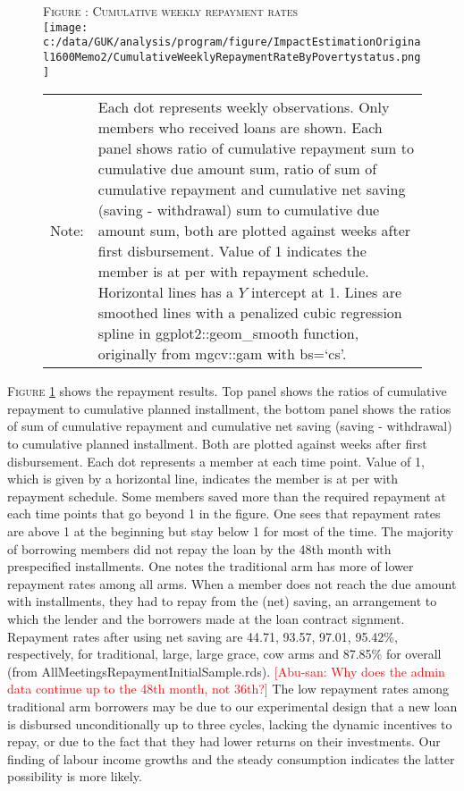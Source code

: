 \begin{figure}
\hfil\textsc{\footnotesize Figure \thefigure: Cumulative weekly repayment rates\label{fig weeklysavingrepayrate}}\\
\hfil\texttt{[image: c:/data/GUK/analysis/program/figure/ImpactEstimationOriginal1600Memo2/CumulativeWeeklyRepaymentRateByPovertystatus.png]}\\
\renewcommand{\arraystretch}{1}
\hfil\begin{tabular}{>{\hfill\scriptsize}p{1cm}<{}>{\scriptsize}p{12cm}<{\hfill}}
Note:& Each dot represents weekly observations. Only members who received loans are shown. Each panel shows ratio of cumulative repayment sum to cumulative due amount sum, ratio of sum of cumulative repayment and cumulative net saving (saving - withdrawal) sum to cumulative due amount sum, both are plotted against weeks after first disbursement. Value of 1 indicates the member is at per with repayment schedule. Horizontal lines has a $Y$ intercept at 1. Lines are smoothed lines with a penalized cubic regression spline in \textsf{ggplot2::geom\_smooth} function, originally from \textsf{mgcv::gam} with \textsf{bs=`cs'}. \\[-1ex]
\end{tabular}
\end{figure}


	\textsc{\footnotesize Figure \ref{fig weeklysavingrepayrate}} shows the repayment results. Top panel shows the ratios of cumulative repayment to cumulative planned installment, the bottom panel shows the ratios of sum of cumulative repayment and cumulative net saving (saving - withdrawal) to cumulative planned installment. Both are plotted against weeks after first disbursement. Each dot represents a member at each time point. Value of 1, which is given by a horizontal line, indicates the member is at per with repayment schedule. Some members saved more than the required repayment at each time points that go beyond 1 in the figure. One sees that repayment rates are above 1 at the beginning but stay below 1 for most of the time. The majority of borrowing members did not repay the loan by the 48th month with prespecified installments. One notes the \textsf{traditional} arm has more of lower repayment rates among all arms. When a member does not reach the due amount with installments, they had to repay from the (net) saving, an arrangement to which the lender and the borrowers made at the loan contract signment. Repayment rates after using net saving are 44.71, 93.57, 97.01, 95.42\%, respectively, for \textsf{traditional, large, large grace, cow} arms and 87.85\% for overall (from \textsf{\footnotesize AllMeetingsRepaymentInitialSample.rds}). \textcolor{red}{[Abu-san: Why does the admin data continue up to the 48th month, not 36th?]} The low repayment rates among \textsf{traditional} arm borrowers may be due to our experimental design that a new loan is disbursed unconditionally up to three cycles, lacking the dynamic incentives to repay, or due to the fact that they had lower returns on their investments. Our finding of labour income growths and the steady consumption indicates the latter possibility is more likely. 

